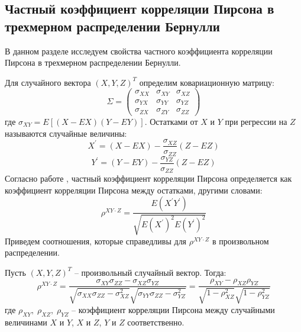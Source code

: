 \subsection{Частный коэффициент корреляции Пирсона в трехмерном распределении Бернулли}\label{partial_section}

В данном разделе исследуем свойства частного коэффициента корреляции Пирсона
в трехмерном распределении Бернулли.

Для случайного вектора $(X,Y,Z)^T$ определим ковариационную матрицу:
$$\Sigma =
    \begin{pmatrix}
        \sigma_{XX} & \sigma_{XY} & \sigma_{XZ} \\
        \sigma_{YX} & \sigma_{YY} & \sigma_{YZ} \\
        \sigma_{ZX} & \sigma_{ZY} & \sigma_{ZZ}
    \end{pmatrix}
$$
где $\sigma_{XY}=E[(X-EX)(Y-EY)]$.
Остатками от $X$ и $Y$ при регрессии на $Z$ называются случайные величины:
$$
X^{\prime}=(X-EX)-\dfrac{\sigma_{XZ}}{\sigma_{ZZ}}(Z-EZ)
$$
$$
Y^{\prime}=(Y-EY)-\dfrac{\sigma_{YZ}}{\sigma_{ZZ}}(Z-EZ)
$$
Согласно работе \cite{Cramér1946}, частный коэффициент корреляции Пирсона определяется как коэффициент
корреляции Пирсона между остатками, другими словами:
$$
\rho^{XY \cdot Z}=\dfrac{E(X^{\prime} Y^{\prime})}{\sqrt{E(X^{\prime})^2 E(Y^{\prime})^2}}
$$
Приведем соотношения, которые справедливы
для $\rho^{XY \cdot Z}$ в произвольном распределении.
\begin{lemma}
    Пусть $(X,Y,Z)^T$ -- произвольный случайный вектор. Тогда:
    $$
    \rho^{XY \cdot Z}=\dfrac{\sigma_{XY} \sigma_{ZZ} - \sigma_{XZ} \sigma_{YZ}}{\sqrt{\sigma_{XX}\sigma_{ZZ}-
        \sigma_{XZ}^2}\sqrt{\sigma_{YY}\sigma_{ZZ}-\sigma_{YZ}^2}}=\dfrac{\rho_{XY}-\rho_{XZ}\rho_{YZ}}{\sqrt{1-\rho_{XZ}^2}\sqrt{1-\rho_{YZ}^2}}
    $$
    где $\rho_{XY}, \; \rho_{XZ}, \; \rho_{YZ}$ -- коэффициент корреляции Пирсона
        между случайными величинами $X$ и $Y$, $X$ и $Z$, $Y$ и $Z$
        соответственно.
\end{lemma}
